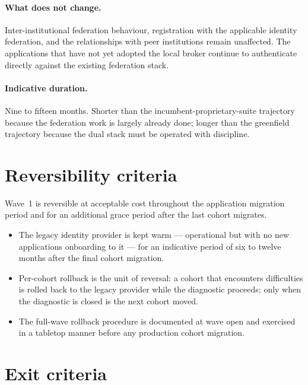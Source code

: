 \paragraph{What does not change.} Inter-institutional federation
behaviour, registration with the applicable identity federation,
and the relationships with peer
institutions remain unaffected. The applications that have not
yet adopted the local broker continue to authenticate directly
against the existing federation stack.

\paragraph{Indicative duration.} Nine to fifteen months. Shorter
than the incumbent-proprietary-suite trajectory because the
federation work
is largely already done; longer than the greenfield trajectory
because the dual stack must be operated with discipline.

\section{Reversibility criteria}
\label{sec:w1-reversibility}

Wave~1 is reversible at acceptable cost throughout the application
migration period and for an additional grace period after the last
cohort migrates.

\begin{itemize}[leftmargin=1.5em,nosep]
  \item The legacy identity provider is kept warm --- operational
    but with no new applications onboarding to it --- for an
    indicative period of six to twelve months after the final
    cohort migration.
  \item Per-cohort rollback is the unit of reversal: a cohort that
    encounters difficulties is rolled back to the legacy provider
    while the diagnostic proceeds; only when the diagnostic is
    closed is the next cohort moved.
  \item The full-wave rollback procedure is documented at wave
    open and exercised in a tabletop manner before any production
    cohort migration.
\end{itemize}

\section{Exit criteria}
\label{sec:w1-exit}

